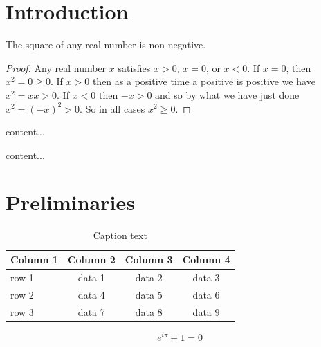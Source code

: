 \documentclass[11pt,reqno]{amsart}
\begin{document}
\vspace{-0.5cm}
\section{Introduction}  %
\lipsum[1]%

\begin{theorem} The square of any real number is non-negative.
\end{theorem}

\begin{proof}
	Any real number $x$ satisfies $x>0$, $x=0$, or $x<0$.
	If $x=0$, then $x^2=0\ge 0$.  If $x>0$ then as a positive time a
	positive is positive we have $x^2=xx>0$.  If $x<0$ then $-x>0$ and so
	by what we have just done $x^2=(-x)^2>0$.  So in all cases $x^2\ge0$.
\end{proof}

\begin{definition}\label{def1}
	content...
\end{definition}


\begin{example}\label{ex1}
	content...
\end{example}

\section{Preliminaries}

\lipsum[2]%

\begin{table}[h]
	\caption{Caption text}\label{tab1}%
	\begin{tabular}{| l | c c c |}
		\hline
		Column 1 & Column 2  & Column 3 & Column 4\\ \hline
		row 1    & data 1   & data 2  & data 3  \\
		row 2    & data 4   & data 5  & data 6  \\
		row 3    & data 7   & data 8  & data 9  \\	\hline
	\end{tabular}
\end{table}

\lipsum[3]%

\bigskip

\begin{equation}\label{eq1}
e^{i\pi}+1=0
\end{equation}
\end{document}
